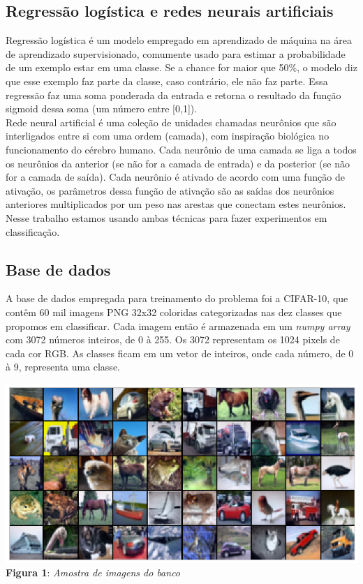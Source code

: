 \documentclass[conference]{IEEEtran}
\begin{document}
\subsection{Regressão logística e redes neurais artificiais}

Regressão logística é um modelo empregado em aprendizado de máquina na área de aprendizado supervisionado, comumente  usado para estimar a probabilidade de um exemplo estar em uma classe. Se a chance for maior que 50\%, o modelo diz que esse exemplo faz parte da classe, caso contrário, ele não faz parte. Essa regressão faz uma soma ponderada da entrada e retorna o resultado da função sigmoid dessa soma (um número entre [0,1]).\cite{b6}\\
Rede neural artificial é uma coleção de unidades chamadas neurônios que são interligados entre si com uma ordem (camada), com inspiração biológica no funcionamento do cérebro humano. Cada neurônio de uma camada se liga a todos os neurônios da anterior (se não for a camada de entrada) e da posterior (se não for a camada de saída). Cada neurônio é ativado de acordo com uma função de ativação, os parâmetros dessa função de ativação são as saídas dos neurônios anteriores multiplicados por um peso nas arestas que conectam estes neurônios\cite{b6}.\\ 
Nesse trabalho estamos usando ambas técnicas para fazer experimentos em classificação.
  
\subsection{Base de dados}
A base de dados empregada para treinamento do problema foi a CIFAR-10\cite{b7}, que contêm 60 mil imagens PNG 32x32 coloridas categorizadas nas dez classes que propomos em classificar. Cada imagem então é armazenada em um \textit{numpy array} com 3072 números inteiros, de 0 à 255. Os 3072 representam os 1024 pixels de cada cor RGB. As classes ficam em um vetor de inteiros, onde cada número, de 0 à 9, representa uma classe.

\begin{center}
\includegraphics[scale=0.20]{cifar10.png}
\\
\textbf{Figura 1}: \textit{Amostra de imagens do banco}
\end{center}
\end{document}
